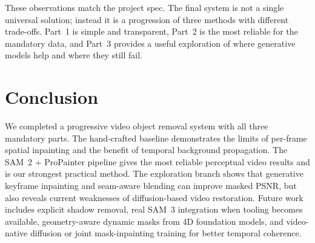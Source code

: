 \documentclass[10pt,twocolumn,letterpaper]{article}
\begin{document}
These observations match the project spec. The final system is not a single universal solution; instead it is a progression of three methods with different trade-offs. Part~1 is simple and transparent, Part~2 is the most reliable for the mandatory data, and Part~3 provides a useful exploration of where generative models help and where they still fail.

\section{Conclusion}
\label{sec:conclusion}
We completed a progressive video object removal system with all three mandatory parts. The hand-crafted baseline demonstrates the limits of per-frame spatial inpainting and the benefit of temporal background propagation. The SAM~2 + ProPainter pipeline gives the most reliable perceptual video results and is our strongest practical method. The exploration branch shows that generative keyframe inpainting and seam-aware blending can improve masked PSNR, but also reveals current weaknesses of diffusion-based video restoration. Future work includes explicit shadow removal, real SAM~3 integration when tooling becomes available, geometry-aware dynamic masks from 4D foundation models, and video-native diffusion or joint mask-inpainting training for better temporal coherence.

{\small


}
\end{document}
